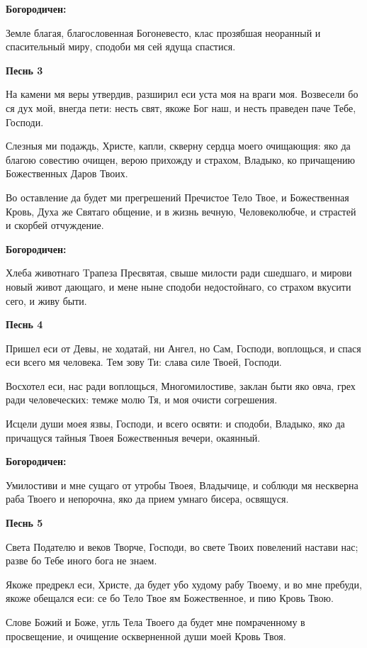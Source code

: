 \medskip
\bfseries Богородичен:\normalfont{}

Земле благая, благословенная Богоневесто, клас прозябшая неоранный и спасительный миру, сподоби мя сей ядуща спастися.


\medskip
\bfseries Песнь 3\normalfont{}


На камени мя веры утвердив, разширил еси уста моя на враги моя. Возвесели бо ся дух мой, внегда пети: несть свят, якоже Бог наш, и несть праведен паче Тебе, Господи.


Слезныя ми подаждь, Христе, капли, скверну сердца моего очищающия: яко да благою совестию очищен, верою прихожду и страхом, Владыко, ко причащению Божественных Даров Твоих.


Во оставление да будет ми прегрешений Пречистое Тело Твое, и Божественная Кровь, Духа же Святаго общение, и в жизнь вечную, Человеколюбче, и страстей и скорбей отчуждение.


\medskip
\bfseries Богородичен:\normalfont{}

Хлеба животнаго Tрапеза Пресвятая, свыше милости ради сшедшаго, и мирови новый живот дающаго, и мене ныне сподоби недостойнаго, со страхом вкусити сего, и живу быти.


\medskip
\bfseries Песнь 4\normalfont{}


Пришел еси от Девы, не ходатай, ни Ангел, но Сам, Господи, воплощься, и спася еси всего мя человека. Тем зову Ти: слава силе Твоей, Господи.


Восхотел еси, нас ради воплощься, Многомилостиве, заклан быти яко овча, грех ради человеческих: темже молю Тя, и моя очисти согрешения.


Исцели души моея язвы, Господи, и всего освяти: и сподоби, Владыко, яко да причащуся тайныя Твоея Божественныя вечери, окаянный.


\medskip
\bfseries Богородичен:\normalfont{}

Умилостиви и мне сущаго от утробы Твоея, Владычице, и соблюди мя нескверна раба Твоего и непорочна, яко да прием умнаго бисера, освящуся.


\medskip
\bfseries Песнь 5\normalfont{}


Света Подателю и веков Творче, Господи, во свете Твоих повелений настави нас; разве бо Тебе иного бога не знаем.


Якоже предрекл еси, Христе, да будет убо худому рабу Твоему, и во мне пребуди, якоже обещался еси: се бо Тело Твое ям Божественное, и пию Кровь Твою.


Слове Божий и Боже, угль Тела Твоего да будет мне помраченному в просвещение, и очищение оскверненной души моей Кровь Твоя.


